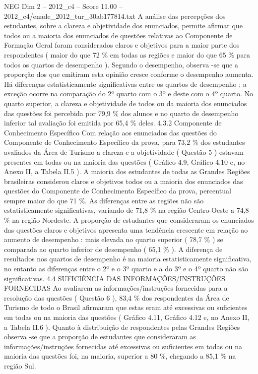 \begin{textsample}{NEG Dim 2 – 2012\_c4 – Score 11.00 – 2012\_c4/enade\_2012\_tur\_30ab177814.txt}
A análise das percepções dos estudantes, sobre a clareza e objetividade dos enunciados, permite afirmar que todos ou a maioria dos enunciados de questões relativas ao Componente de Formação Geral foram considerados claros e objetivos para a maior parte dos respondentes ( maior do que 72 \% em todas as regiões e maior do que 65 \% para todos os quartos de desempenho ).
Segundo o desempenho, observa -se que a proporção dos que emitiram esta opinião cresce conforme o desempenho aumenta.
Há diferenças estatisticamente significativas entre os quartos de desempenho ; a exceção ocorre na comparação do 2º quarto com o 3º e deste com o 4º quarto.
No quarto superior, a clareza e objetividade de todos ou da maioria dos enunciados das questões foi percebida por 79,9 \% dos alunos e no quarto de desempenho inferior tal avaliação foi emitida por 65,4 \% deles. 4.3.2 Componente de Conhecimento Específico Com relação aos enunciados das questões do Componente de Conhecimento Específico da prova, para 73,2 \% dos estudantes avaliados da Área de Turismo a clareza e a objetividade ( Questão 5 ) estavam presentes em todas ou na maioria das questões ( Gráfico 4.9, Gráfico 4.10 e, no Anexo II, a Tabela II.5 ).
A maioria dos estudantes de todas as Grandes Regiões brasileiras considerou claros e objetivos todos ou a maioria dos enunciados das questões do Componente de Conhecimento Específico da prova, percentual sempre maior do que 71 \%.
As diferenças entre as regiões não são estatisticamente significativas, variando de 71,8 \% na região Centro-Oeste a 74,8 \% na região Nordeste.
A proporção de estudantes que consideraram os enunciados das questões claros e objetivos apresenta uma tendência crescente em relação ao aumento de desempenho : mais elevada no quarto superior ( 78,7 \% ) se comparada ao quarto inferior de desempenho ( 65,1 \% ).
A diferença de resultados nos quartos de desempenho é na maioria estatisticamente significativa, no entanto as diferenças entre o 2º e o 3º quarto e a do 3º e o 4º quarto não são significativas. 4.4 SUFICIÊNCIA DAS INFORMAÇÕES/INSTRUÇÕES FORNECIDAS Ao avaliarem as informações/instruções fornecidas para a resolução das questões ( Questão 6 ), 83,4 \% dos respondentes da Área de Turismo de todo o Brasil afirmaram que estas eram até excessivas ou suficientes em todas ou na maioria das questões ( Gráfico 4.11, Gráfico 4.12 e, no Anexo II, a Tabela II.6 ).
Quanto à distribuição de respondentes pelas Grandes Regiões observa -se que a proporção de estudantes que consideraram as informações/instruções fornecidas até excessivas ou suficientes em todas ou na maioria das questões foi, na maioria, superior a 80 \%, chegando a 85,1 \% na região Sul.

\end{textsample}
